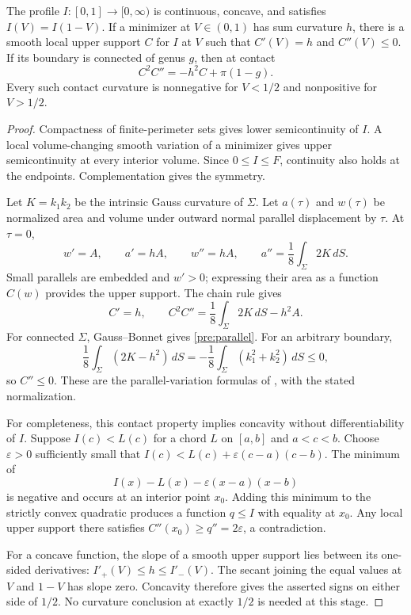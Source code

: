 \begin{lemma}\label{pre:supports}
The profile \(I:[0,1]\to[0,\infty)\) is continuous, concave, and satisfies
\(I(V)=I(1-V)\). If a minimizer at \(V\in(0,1)\) has sum curvature \(h\),
there is a smooth local upper support \(C\) for \(I\) at \(V\) such that
\(C'(V)=h\) and \(C''(V)\le0\). If its boundary is connected of genus \(g\),
then at contact
\begin{equation}
 C^2C''=-h^2C+\pi(1-g).
 \label{pre:parallel}
\end{equation}
Every such contact curvature is nonnegative for \(V<1/2\) and
nonpositive for \(V>1/2\).
\end{lemma}

\begin{proof}
Compactness of finite-perimeter sets gives lower semicontinuity of \(I\).
A local volume-changing smooth variation of a minimizer gives upper
semicontinuity at every interior volume. Since \(0\le I\le F\), continuity
also holds at the endpoints. Complementation gives the symmetry.

Let \(K=k_1k_2\) be the intrinsic Gauss curvature of \(\Sigma\).
Let \(a(\tau)\) and \(w(\tau)\) be normalized area and volume under
outward normal parallel displacement by \(\tau\). At \(\tau=0\),
\[
 w'=A,\qquad a'=hA,\qquad w''=hA,\qquad
 a''=\frac18\int_\Sigma 2K\,dS.
\]
Small parallels are embedded and \(w'>0\); expressing their area as a
function \(C(w)\) provides the upper support. The chain rule gives
\[
 C'=h,\qquad
 C^2C''=\frac18\int_\Sigma 2K\,dS-h^2A.
\]
For connected \(\Sigma\), Gauss--Bonnet gives \eqref{pre:parallel}.
For an arbitrary boundary,
\[
 \frac18\int_\Sigma(2K-h^2)\,dS
       =-\frac18\int_\Sigma(k_1^2+k_2^2)\,dS\le0,
\]
so \(C''\le0\). These are the parallel-variation formulas of
\cite[Section~3]{HPRR}, with the stated normalization.

For completeness, this contact property implies concavity without
differentiability of \(I\). Suppose \(I(c)<L(c)\) for a chord \(L\) on
\([a,b]\) and \(a<c<b\). Choose \(\varepsilon>0\) sufficiently small
that \(I(c)<L(c)+\varepsilon(c-a)(c-b)\).
The minimum of
\[
 I(x)-L(x)-\varepsilon(x-a)(x-b)
\]
is negative and occurs at an interior point \(x_0\).
Adding this minimum to the strictly convex quadratic produces a function
\(q\le I\) with equality at \(x_0\).
Any local upper support there satisfies \(C''(x_0)\ge q''=2\varepsilon\),
a contradiction.

For a concave function, the slope of a smooth upper support lies between
its one-sided derivatives:
\(I'_+(V)\le h\le I'_-(V)\).
The secant joining the equal values at \(V\) and \(1-V\) has slope zero.
Concavity therefore gives the asserted signs on either side of \(1/2\).
No curvature conclusion at exactly \(1/2\) is needed at this stage.
\end{proof}

